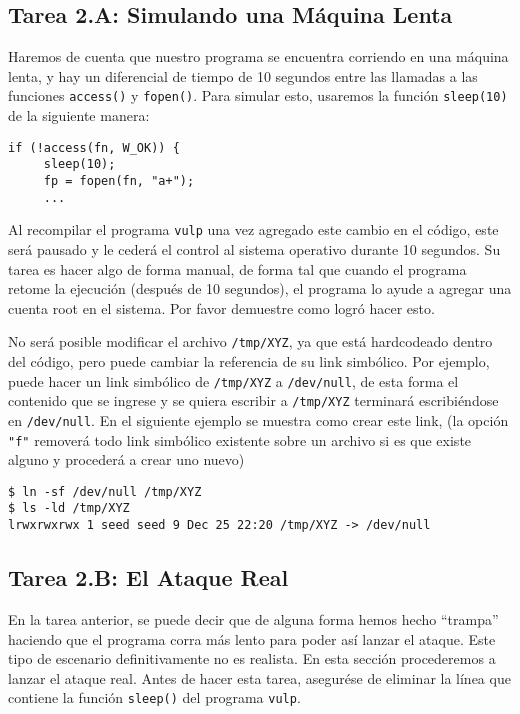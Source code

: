 \subsection{Tarea 2.A: Simulando una Máquina Lenta} 

Haremos de cuenta que nuestro programa se encuentra corriendo en una máquina lenta, y hay un diferencial de tiempo de 10 segundos entre las llamadas a las funciones \texttt{access()} y \texttt{fopen()}. Para simular esto, usaremos la función \texttt{sleep(10)} de la siguiente manera:

\begin{lstlisting}
if (!access(fn, W_OK)) {
     sleep(10);
     fp = fopen(fn, "a+");
     ...
\end{lstlisting}
 
Al recompilar el programa \texttt{vulp} una vez agregado este cambio en el código, este será pausado y le cederá el control al sistema operativo durante 10 segundos.
Su tarea es hacer algo de forma manual, de forma tal que cuando el programa retome la ejecución (después de 10 segundos), el programa lo ayude a agregar una cuenta root en el sistema. Por favor demuestre como logró hacer esto.

No será posible modificar el archivo \texttt{/tmp/XYZ}, ya que está hardcodeado dentro del código, pero puede cambiar la referencia de su link simbólico. Por ejemplo, puede hacer un link simbólico de \texttt{/tmp/XYZ} a \texttt{/dev/null}, de esta forma el contenido que se ingrese y se quiera escribir a \texttt{/tmp/XYZ} terminará escribiéndose en \texttt{/dev/null}. En el siguiente ejemplo se muestra como crear este link, (la opción \texttt{"f"} removerá todo link simbólico existente sobre un archivo si es que existe alguno y procederá a crear uno nuevo)


\begin{lstlisting}
$ ln -sf /dev/null /tmp/XYZ
$ ls -ld /tmp/XYZ
lrwxrwxrwx 1 seed seed 9 Dec 25 22:20 /tmp/XYZ -> /dev/null
\end{lstlisting}
 
\subsection{Tarea 2.B: El Ataque Real}

En la tarea anterior, se puede decir que de alguna forma hemos hecho ``trampa'' haciendo que el programa corra más lento para poder así lanzar el ataque. Este tipo de escenario definitivamente no es realista. En esta sección procederemos a lanzar el ataque real.
Antes de hacer esta tarea, asegurése de eliminar la línea que contiene la función  \texttt{sleep()} del programa \texttt{vulp}.

